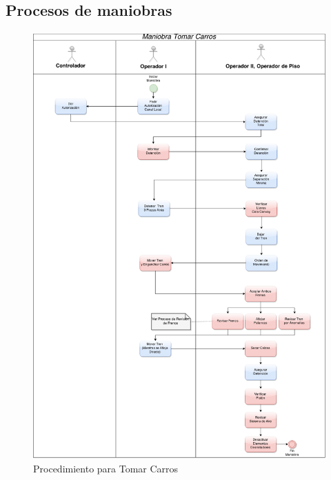 \documentclass[oneside,12pt, letterpaper, titlepage]{book}
\begin{document}
\begin{appendices}
\section{Procesos de maniobras}
\begin{figure}[H]
    \centering
    \includegraphics[scale=0.35]{./images/MTC}
    \caption{Procedimiento para Tomar Carros}
    \label{fig:MTC}
\end{figure}


\end{appendices}
\end{document}
